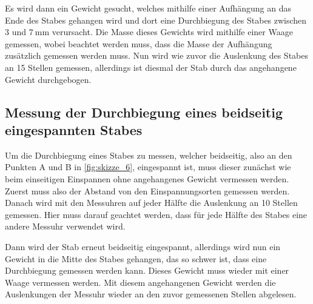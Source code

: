 Es wird dann ein Gewicht gesucht, welches mithilfe einer Aufhängung an das Ende des Stabes gehangen wird und dort eine Durchbiegung des Stabes zwischen $\num{3}$ und $\SI{7}{\milli\meter}$ verursacht.
Die Masse dieses Gewichts wird mithilfe einer Waage gemessen, wobei beachtet werden muss, dass die Masse der Aufhängung zusätzlich gemessen werden muss.
Nun wird wie zuvor die Auslenkung des Stabes an 15 Stellen gemessen, allerdings ist diesmal der Stab durch das angehangene Gewicht durchgebogen. 

\subsection{Messung der Durchbiegung eines beidseitig eingespannten Stabes}
\label{sec:Durchführung_Beidseitig}

Um die Durchbiegung eines Stabes zu messen, welcher beidseitig, also an den Punkten A und B in \autoref{fig:skizze_6}, eingespannt ist, muss dieser zunächst wie beim einseitigen Einspannen ohne angehangenes Gewicht vermessen werden. Zuerst muss also der Abstand von den Einspannungsorten gemessen werden.
Danach wird mit den Messuhren auf jeder Hälfte die Auslenkung an 10 Stellen gemessen.
Hier muss darauf geachtet werden, dass für jede Hälfte des Stabes eine andere Messuhr verwendet wird.

Dann wird der Stab erneut beidseitig eingespannt, allerdings wird nun ein Gewicht in die Mitte des Stabes gehangen, das so schwer ist, dass eine Durchbiegung gemessen werden kann. 
Dieses Gewicht muss wieder mit einer Waage vermessen werden.
Mit diesem angehangenen Gewicht werden die Auslenkungen der Messuhr wieder an den zuvor gemessenen Stellen abgelesen.

